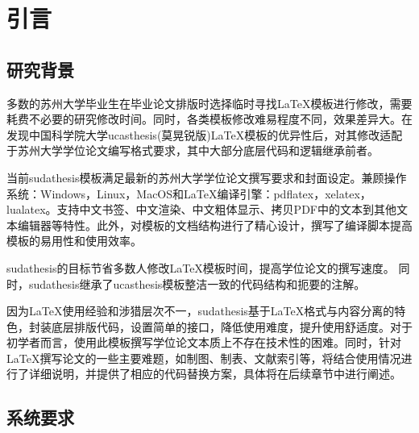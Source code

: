 \chapter{引言}\label{chap:introduction}

\section{研究背景}

多数的苏州大学毕业生在毕业论文排版时选择临时寻找\LaTeX{}模板进行修改，需要耗费不必要的研究修改时间。同时，各类模板修改难易程度不同，效果差异大。在发现中国科学院大学ucasthesis(莫晃锐版)\LaTeX{}模板的优异性后，对其修改适配于苏州大学学位论文编写格式要求，其中大部分底层代码和逻辑继承前者。

当前sudathesis模板满足最新的苏州大学学位论文撰写要求和封面设定。兼顾操作系统：Windows，Linux，MacOS和\LaTeX{}编译引擎：pdflatex，xelatex，lualatex。支持中文书签、中文渲染、中文粗体显示、拷贝PDF中的文本到其他文本编辑器等特性。此外，对模板的文档结构进行了精心设计，撰写了编译脚本提高模板的易用性和使用效率。

sudathesis的目标节省多数人修改\LaTeX{}模板时间，提高学位论文的撰写速度。 同时，sudathesis继承了ucasthesis模板整洁一致的代码结构和扼要的注解。

因为\LaTeX{}使用经验和涉猎层次不一，sudathesis基于\LaTeX{}格式与内容分离的特色，封装底层排版代码，设置简单的接口，降低使用难度，提升使用舒适度。对于初学者而言，使用此模板撰写学位论文本质上不存在技术性的困难。同时，针对\LaTeX{}撰写论文的一些主要难题，如制图、制表、文献索引等，将结合使用情况进行了详细说明，并提供了相应的代码替换方案，具体将在后续章节中进行阐述。


\section{系统要求}\label{sec:system}

